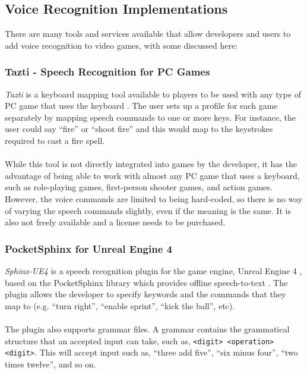 \documentclass[11pt]{article}
\begin{document}
\subsection{Voice Recognition Implementations}

There are many tools and services available that allow developers and users to add voice recognition to video games, with some discussed here:

\subsubsection{Tazti - Speech Recognition for PC Games}

\textit{Tazti} is a keyboard mapping tool available to players to be used with any type of PC game that uses the keyboard \cite{RefWorks:28}. The user sets up a profile for each game separately by mapping speech commands to one or more keys. For instance, the user could say ``fire'' or ``shoot fire'' and this would map to the keystrokes required to cast a fire spell.
\\
\\
While this tool is not directly integrated into games by the developer, it has the advantage of being able to work with almost any PC game that uses a keyboard, such as role-playing games, first-person shooter games, and action games. However, the voice commands are limited to being hard-coded, so there is no way of varying the speech commands slightly, even if the meaning is the same. It is also not freely available and a license needs to be purchased.

\subsubsection{PocketSphinx for Unreal Engine 4}

\textit{Sphinx-UE4} is a speech recognition plugin for the game engine, Unreal Engine 4 \cite{RefWorks:104}, based on the PocketSphinx library which provides offline speech-to-text \cite{RefWorks:105}. The plugin allows the developer to specify keywords and the commands that they map to (e.g. ``turn right'', ``enable sprint'', ``kick the ball'', etc).
\\
\\
The plugin also supports grammar files. A grammar contains the grammatical structure that an accepted input can take, such as, \texttt{<digit> <operation> <digit>}. This will accept input such as, ``three add five'', ``six minus four'', ``two times twelve'', and so on.
\end{document}
